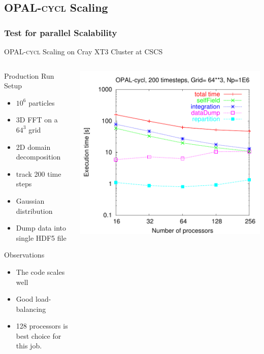 \documentclass{beamer}
\newcommand{\opalcycl}{\textsc{OPAL-cycl }}
\begin{document}
  \subsection{\opalcycl Scaling }
  
  \begin{frame} 
    \frametitle{Test for parallel Scalability}
{\opalcycl Scaling on Cray XT3 Cluster at CSCS}
    \begin{columns}
      \begin{column}{4.cm}
	\scriptsize
	\begin{block}{Production Run Setup}
          \begin{itemize}
          \item $10^6$ particles 
          \item 3D FFT on a $64^3$ grid
	  \item 2D domain decomposition 
	  \item track 200 time steps
          \item Gaussian distribution
	  \item Dump data into single HDF5 file
          \end{itemize}
	\end{block}
	
	\begin{block}{Observations}
          \begin{itemize}
          \item The code scales well
	  \item Good load-balancing
	  \item 128 processors is best choice for this job.
          \end{itemize}
	\end{block}
      \end{column}
      \begin{column}{7.0cm}
	\includegraphics[width=\linewidth]{figures/Timing64mesh}         
      \end{column}
    \end{columns}
  \end{frame}
\end{document}

